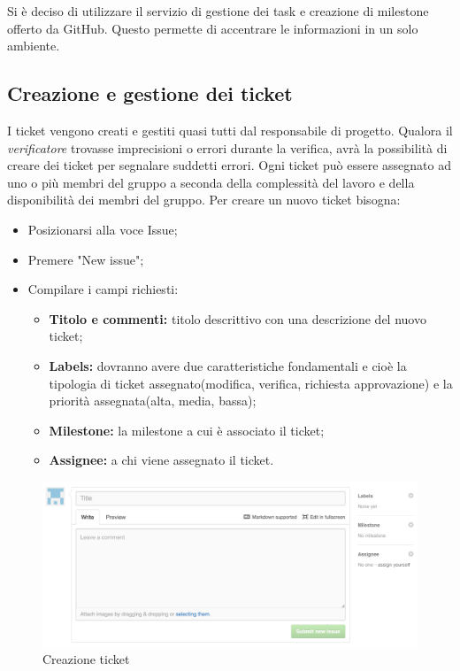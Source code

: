 Si è deciso di utilizzare il servizio di gestione dei task e creazione di milestone offerto da GitHub. Questo permette di accentrare le informazioni in un solo ambiente.\\

\subsection{Creazione e gestione dei ticket}

I ticket vengono creati e gestiti quasi tutti dal responsabile di progetto.
Qualora il \textit{verificatore} trovasse imprecisioni o errori durante la verifica, avrà la possibilità di creare dei ticket per segnalare suddetti errori.
Ogni ticket può essere assegnato ad uno o più membri del gruppo a seconda della complessità del lavoro e della disponibilità dei membri del gruppo.
Per creare un nuovo ticket bisogna:

\begin{itemize}
	\item Posizionarsi alla voce Issue;
	\item Premere "New issue";
	\item Compilare i campi richiesti:
		\begin{itemize}
			\item \textbf{Titolo e commenti:} titolo descrittivo con una descrizione del nuovo ticket;
			\item \textbf{Labels:} dovranno avere due caratteristiche fondamentali e cioè la tipologia di ticket assegnato(modifica, verifica, richiesta approvazione) e la priorità assegnata(alta, media, bassa);
			\item \textbf{Milestone:} la milestone a cui è associato il ticket;
			\item \textbf{Assignee:} a chi viene assegnato il ticket.
		\end{itemize}
\end{itemize}
\begin{figure}[h]
\centering
\includegraphics[width=0.7\linewidth]{img/ticket}
\caption[Creazione ticket]{Creazione ticket}
\label{fig:ticket}
\end{figure}


